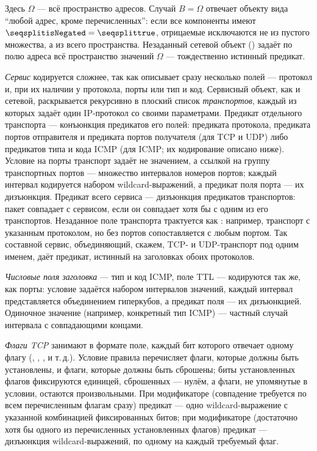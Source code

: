 Здесь $\Omega$ --- всё пространство адресов. Случай $B = \Omega$ отвечает объекту вида ``любой адрес, кроме перечисленных'': если все компоненты имеют $\tx{isNegated} = \tx{true}$, отрицаемые исключаются не из пустого множества, а из всего пространства. Незаданный сетевой объект () задаёт по полю адреса всё пространство значений $\Omega$ --- тождественно истинный предикат.

\emph{Сервис} кодируется сложнее, так как описывает сразу несколько полей --- протокол и, при их наличии у протокола, порты или тип и код. Сервисный объект, как и сетевой, раскрывается рекурсивно в плоский список \emph{транспортов}, каждый из которых задаёт один IP-протокол со своими параметрами. Предикат отдельного транспорта --- конъюнкция предикатов его полей: предиката протокола, предиката портов отправителя и предиката портов получателя (для TCP и UDP) либо предикатов типа и кода ICMP (для ICMP; их кодирование описано ниже). Условие на порты транспорт задаёт не значением, а ссылкой на группу транспортных портов --- множество интервалов номеров портов; каждый интервал кодируется набором wildcard-выражений, а предикат поля порта --- их дизъюнкция. Предикат всего сервиса --- дизъюнкция предикатов транспортов: пакет совпадает с сервисом, если он совпадает хотя бы с одним из его транспортов. Незаданное поле транспорта трактуется как : например, транспорт с указанным протоколом, но без портов сопоставляется с любым портом. Так составной сервис, объединяющий, скажем, TCP- и UDP-транспорт под одним именем, даёт предикат, истинный на заголовках обоих протоколов.

\emph{Числовые поля заголовка} --- тип и код ICMP, поле TTL --- кодируются так же, как порты: условие задаётся набором интервалов значений, каждый интервал представляется объединением гиперкубов, а предикат поля --- их дизъюнкцией. Одиночное значение (например, конкретный тип ICMP) --- частный случай интервала с совпадающими концами.

\emph{Флаги TCP} занимают в формате поле, каждый бит которого отвечает одному флагу (, , ,  и т.\,д.). Условие правила перечисляет флаги, которые должны быть установлены, и флаги, которые должны быть сброшены; биты установленных флагов фиксируются единицей, сброшенных --- нулём, а флаги, не упомянутые в условии, остаются произвольными. При модификаторе  (совпадение требуется по всем перечисленным флагам сразу) предикат --- одно wildcard-выражение с указанной комбинацией фиксированных битов; при модификаторе  (достаточно хотя бы одного из перечисленных установленных флагов) предикат --- дизъюнкция wildcard-выражений, по одному на каждый требуемый флаг.


